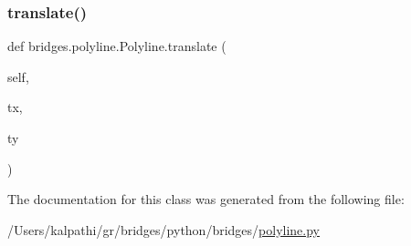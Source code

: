 \mbox{\label{classbridges_1_1polyline_1_1_polyline_a654226c0de86aa0c6b9b5181a552cbfe}} 
\subsubsection{\texorpdfstring{translate()}{translate()}}
{\footnotesize\ttfamily def bridges.\+polyline.\+Polyline.\+translate (\begin{DoxyParamCaption}\item[{}]{self,  }\item[{}]{tx,  }\item[{}]{ty }\end{DoxyParamCaption})}



The documentation for this class was generated from the following file\+:\begin{DoxyCompactItemize}
\item 
/\+Users/kalpathi/gr/bridges/python/bridges/\mbox{\hyperlink{polyline_8py}{polyline.\+py}}\end{DoxyCompactItemize}

